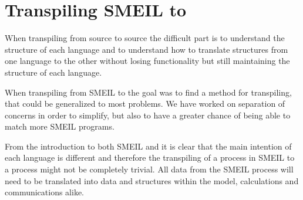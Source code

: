 





\section{Transpiling SMEIL to \cspm{}} \label{sec:transpiling}
When transpiling from source to source the difficult part is to understand the structure of each language and to understand how to translate structures from one language to the other without losing functionality but still maintaining the structure of each language.

When transpiling from SMEIL to \cspm{} the goal was to find a method for transpiling, that could be generalized to most problems. We have worked on separation of concerns in order to simplify, but also to have a greater chance of being able to match more SMEIL programs.

From the introduction to both SMEIL and \cspm it is clear that the main intention of each language is different and therefore the transpiling of a process in SMEIL to a \cspm process might not be completely trivial. All data from the SMEIL process will need to be translated into data and structures within the \cspm model, calculations and communications alike.







